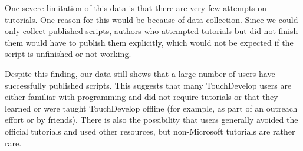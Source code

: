 
One severe limitation of this data is that there are very few attempts on tutorials. One reason for this would be because of data collection. Since we could only collect published scripts, authors who attempted tutorials but did not finish them would have to publish them explicitly, which would not be expected if the script is unfinished or not working.

 Despite this finding, our data still shows that a large number of users have successfully published scripts. This suggests that many TouchDevelop users are either familiar with programming and did not require tutorials or that they learned or were taught TouchDevelop offline (for example, as part of an outreach effort or by friends). There is also the possibility that users generally avoided the official tutorials and used other resources, but non-Microsoft tutorials are rather rare. 







